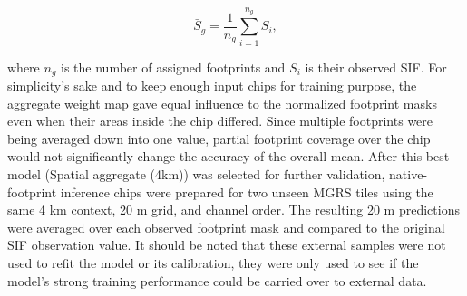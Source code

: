 \begin{equation}
    \bar{S}_g=\frac{1}{n_g}\sum_{i=1}^{n_g}S_i,
    \label{eq:spatial_aggregate_target}
\end{equation}

where $n_g$ is the number of assigned footprints and $S_i$ is their observed SIF. For simplicity's sake and to keep enough input chips for training purpose, the aggregate weight map gave equal influence to the normalized footprint masks even when their areas inside the chip differed. Since multiple footprints were being averaged down into one value, partial footprint coverage over the chip would not significantly change the accuracy of the overall mean. After this best model (Spatial aggregate (4km)) was selected for further validation, native-footprint inference chips were prepared for two unseen MGRS tiles using the same 4 km context, 20 m grid, and channel order. The resulting 20 m predictions were averaged over each observed footprint mask and compared to the original SIF observation value. It should be noted that these external samples were not used to refit the model or its calibration, they were only used to see if the model's strong training performance could be carried over to external data.

